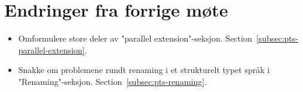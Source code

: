 
\chapter*{Endringer fra forrige møte}

\begin{itemize}
    \item Omformulere store deler av "parallel extension"-seksjon.
    Section~\vref{subsec:pts-parallel-extension}.
    \item Snakke om problemene rundt renaming i et strukturelt typet språk i "Renaming"-seksjon.
    Section~\vref{subsec:pts-renaming}.
\end{itemize}

